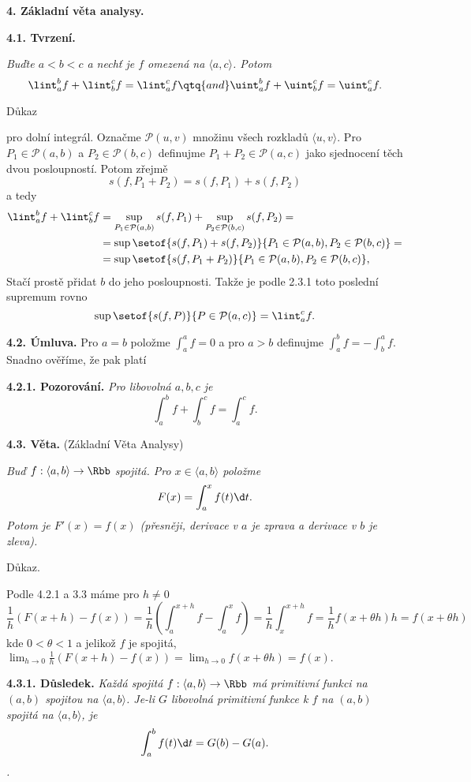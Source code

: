 \documentclass[12pt]{article}
\begin{document}
{ {\large\bf 4. Základní  věta analysy.} 
 
 \bigskip
 
 {\bf 4.1. Tvrzení.} {\em Buďte $a<b<c$ a nechť je $f$  omezená na $\langle a,c\rangle$. Potom
 $$
 \lint_a^bf+\lint_b^cf=\lint_a^cf \qtq{and} \uint_a^bf+\uint_b^cf=\uint_a^cf.
$$

Důkaz} pro dolní integrál. Označme $\mathcal P(u,v)$ množinu všech rozkladů $\langle u,v\rangle$. Pro $P_1\in\mathcal P(a,b)$ a $P_2\in\mathcal P(b,c)$ definujme 
$P_1+P_2\in\mathcal P(a,c)$ jako sjednocení těch dvou posloupností. Potom zřejmě
$$
s(f,P_1+P_2)=s(f,P_1)+s(f,P_2)
$$
a tedy
$$
\begin{aligned}
\lint_a^bf+\lint_b^cf &=\sup_{P_1\in\mathcal P(a,b)}s(f,P_1)+\sup_{P_2\in\mathcal P(b,c)}s(f,P_2)=\\
&=\sup\setof{s(f,P_1)+s(f,P_2)}{P_1\in\mathcal P(a,b),P_2\in\mathcal P(b,c)}=\\
&=\sup\setof{s(f,P_1+P_2)}{P_1\in\mathcal P(a,b),P_2\in\mathcal P(b,c)},
\end{aligned}
$$
Stačí prostě přidat $b$ do jeho posloupnosti.
Takže je podle 2.3.1 toto poslední supremum rovno
$$
\sup\setof{s(f,P)}{P\in\mathcal P(a,c)}=\lint_a^cf.
$$ \sq

\bigskip

{\bf 4.2. Úmluva.} Pro $a=b$ položme $\int_a^af=0$ a pro $a>b$  definujme $\int_a^bf=-\int_b^af$. Snadno ověříme, že pak platí

\medskip

{\bf 4.2.1. Pozorování.} {\em Pro libovolná $a,b,c$ je
$$
 \int_a^bf+\int_b^cf=\int_a^cf.
$$}

\bigskip

{\bf 4.3. Věta.} (Základní Věta Analysy) {\em Buď $f:\langle a,b\rangle\to\Rbb$ spojitá. Pro $x\in\langle a,b\rangle$ položme
$$
F(x)=\int_a^xf(t)\d t.
$$
 Potom je
$F'(x)=f(x)$ (přesněji, derivace v $a$ je zprava a derivace v $b$ je zleva).

Důkaz.} Podle 4.2.1 a 3.3 máme pro $h\neq 0$
$$
\frac{1}{h}(F(x+h)-f(x))=\frac{1}{h}(\int_a^{x+h}f-\int_a^xf)=\frac{1}{h}\int_x^{x+h}f=
\frac{1}{h}f(x+\theta h)h=f(x+\theta h)
$$
kde $0<\theta<1$ a jelikož $f$ je spojitá, $\lim_{h\to 0}\frac{1}{h}(F(x+h)-f(x))=
\lim_{h\to 0}f(x+\theta h)=f(x).
$
\sq

\medskip

{\bf 4.3.1. Důsledek.} {\em Každá spojitá $f:\langle a,b\rangle\to\Rbb$ má primitivní funkci na  $(a,b)$ spojitou na $\langle a,b\rangle$.
Je-li $G$ libovolná primitivní funkce k $f$ na $(a,b)$ spojitá na $\langle a,b\rangle$, je 
$$
\int_a^bf(t)\d t=G(b)-G(a).
$$.}

}
\end{document}
